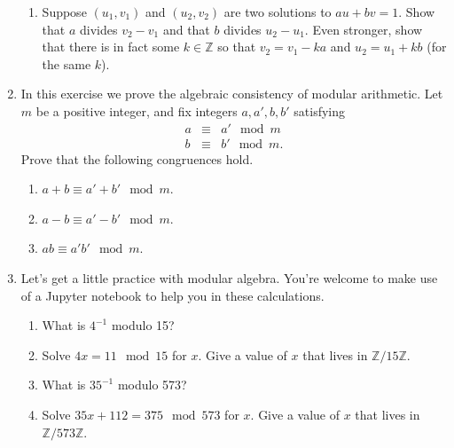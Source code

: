 \documentclass[11pt]{article}
\newcommand{\bZ}{\mathbb{Z}}
\begin{document}
\begin{enumerate}
{\begin{enumerate}
{    }
    \item{Suppose $(u_1,v_1)$ and $(u_2,v_2)$ are two solutions to $au+bv=1$.  Show that $a$ divides $v_2-v_1$ and that $b$ divides $u_2-u_1$.  Even stronger, show that there is in fact some $k\in\bZ$ so that $v_2 = v_1-ka$ and $u_2 = u_1+kb$ (for the same $k$).}
  \end{enumerate}
  }
  \item{
  In this exercise we prove the algebraic consistency of modular arithmetic.  Let $m$ be a positive integer, and fix integers $a,a',b,b'$ satisfying
  \begin{eqnarray*}
    a&\equiv& a'\mod m\\
    b&\equiv& b'\mod m.
  \end{eqnarray*}
  Prove that the following congruences hold.
  \begin{enumerate}
    \item{
    $a+b\equiv a'+b'\mod m$.
    }
    \item{
    $a-b\equiv a'-b'\mod m$.
    }
    \item{
    $ab\equiv a'b'\mod m$.
    }
  \end{enumerate}
  }
  \item{
  Let's get a little practice with modular algebra.  You're welcome to make use of a Jupyter notebook to help you in these calculations.
  \begin{enumerate}
    \item{
    What is $4^{-1}$ modulo 15?
    }
    \item{
    Solve $4x = 11 \mod 15$ for $x$.  Give a value of $x$ that lives in $\bZ/15\bZ$.
    }
    \item{
    What is $35^{-1}$ modulo 573?
    }
    \item{
    Solve $35x + 112 = 375\mod 573$ for $x$.  Give a value of $x$ that lives in $\bZ/573\bZ$.
    }
  \end{enumerate}
  }
\end{enumerate}
\end{document}
